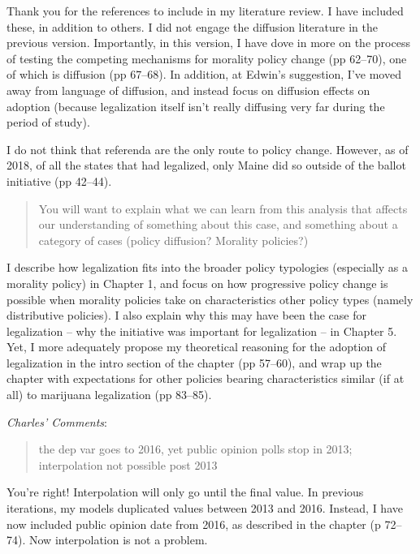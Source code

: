 \documentclass[12pt,stdletter,dateno,sigleft]{newlfm} %
\begin{document}
\begin{newlfm}
Thank you for the references to include in my literature review. I have included these, in addition to others. I did not engage the diffusion literature in the previous version. Importantly, in this version, I have dove in more on the process of testing the competing mechanisms for morality policy change (pp 62--70), one of which is diffusion (pp 67--68). In addition, at Edwin's suggestion, I've moved away from language of diffusion, and instead focus on diffusion effects on adoption (because legalization itself isn't really diffusing very far during the period of study). 

I do not think that referenda are the only route to policy change. However, as of 2018, of all the states that had legalized, only Maine did so outside of the ballot initiative (pp 42--44). 


\begin{quotation}{\color{red}\noindent \footnotesize
You will want to explain what we can learn from this analysis that affects our understanding of something about this case, and something about a category of cases (policy diffusion? Morality policies?)
}
\end{quotation}


I describe how legalization fits into the broader policy typologies (especially as a morality policy) in Chapter 1, and focus on how progressive policy change is possible when morality policies take on characteristics other policy types (namely distributive policies). I also explain why this may have been the case for legalization -- why the initiative was important for legalization -- in Chapter 5.  Yet, I more adequately propose my theoretical reasoning for the adoption of legalization in the intro section of the chapter (pp 57--60), and wrap up the chapter with expectations for other policies bearing characteristics similar (if at all) to marijuana legalization (pp 83--85). \newline


\textit{Charles' Comments}:

\begin{quotation}{\color{red}\noindent \footnotesize
the dep var goes to 2016, yet public opinion polls stop in 2013; interpolation not possible post 2013
}
\end{quotation}

You're right! Interpolation will only go until the final value. In previous iterations, my models duplicated values between 2013 and 2016. Instead, I have now included public opinion date from 2016, as described in the chapter (p 72--74). Now interpolation is not a problem.


\end{newlfm}
\end{document}
